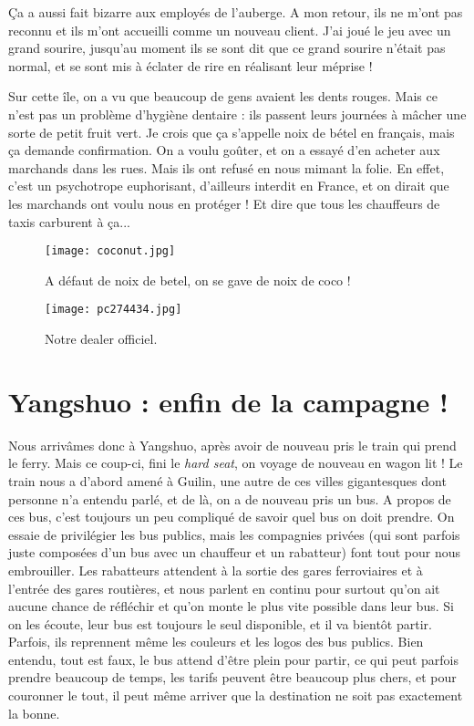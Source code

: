 \documentclass{book}
\begin{document}
Ça a aussi fait bizarre aux employés de l'auberge. A mon retour, ils ne m'ont pas reconnu et ils m'ont accueilli comme un nouveau client. J'ai joué le jeu avec un grand sourire, jusqu'au moment ils se sont dit que ce grand sourire n'était pas normal, et se sont mis à éclater de rire en réalisant leur méprise !


Sur cette île, on a vu que beaucoup de gens avaient les dents rouges. Mais ce n'est pas un problème d'hygiène dentaire : ils passent leurs journées à mâcher une sorte de petit fruit vert. Je crois que ça s'appelle noix de bétel en français, mais ça demande confirmation. On a voulu goûter, et on a essayé d'en acheter aux marchands dans les rues. Mais ils ont refusé en nous mimant la folie. En effet, c'est un psychotrope euphorisant, d'ailleurs interdit en France, et on dirait que les marchands ont voulu nous en protéger ! Et dire que tous les chauffeurs de taxis carburent à ça...


\begin{figure}[h]
\centering
\texttt{[image: coconut.jpg]}
\caption*{A défaut de noix de betel, on se gave de noix de coco !}
\end{figure}


\begin{figure}[h]
\centering
\texttt{[image: pc274434.jpg]}
\caption*{Notre dealer officiel.}
\end{figure}



\chapter{Yangshuo : enfin de la campagne  !}


Nous arrivâmes donc à Yangshuo, après avoir de nouveau pris le train qui prend le ferry. Mais ce coup-ci, fini le \emph{hard seat}, on voyage de nouveau en wagon lit ! Le train nous a d'abord amené à Guilin, une autre de ces villes gigantesques dont personne n'a entendu parlé, et de là, on a de nouveau pris un bus. A propos de ces bus, c'est toujours un peu compliqué de savoir quel bus on doit prendre. On essaie de privilégier les bus publics, mais les compagnies privées (qui sont parfois juste composées d'un bus avec un chauffeur et un rabatteur) font tout pour nous embrouiller. Les rabatteurs attendent à la sortie des gares ferroviaires et à l'entrée des gares routières, et nous parlent en continu pour surtout qu'on ait aucune chance de réfléchir et qu'on monte le plus vite possible dans leur bus. Si on les écoute, leur bus est toujours le seul disponible, et il va bientôt partir. Parfois, ils reprennent même les couleurs et les logos des bus publics. Bien entendu, tout est faux, le bus attend d'être plein pour partir, ce qui peut parfois prendre beaucoup de temps, les tarifs peuvent être beaucoup plus chers, et pour couronner le tout, il peut même arriver que la destination ne soit pas exactement la bonne.
\end{document}
